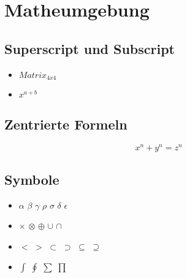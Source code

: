 \chapter{Matheumgebung}

\section{Superscript und Subscript}

\begin{itemize}
 \item $Matrix_{4x4}$
 \item $x^{a + b}$
\end{itemize}

\section{Zentrierte Formeln}

\[ x^n + y^n = z^n \]

\section{Symbole}

\begin{itemize}
  \item $\alpha$ $\beta$ $\gamma$ $\rho$ $\sigma$ $\delta$ $\epsilon$
  \item $\times$ $\otimes$ $\oplus$ $\cup$ $\cap$
  \item $<$ $>$ $\subset$ $\supset$ $\subseteq$ $\supseteq$
  \item $\int$ $\oint$ $\sum$ $\prod$
\end{itemize}

